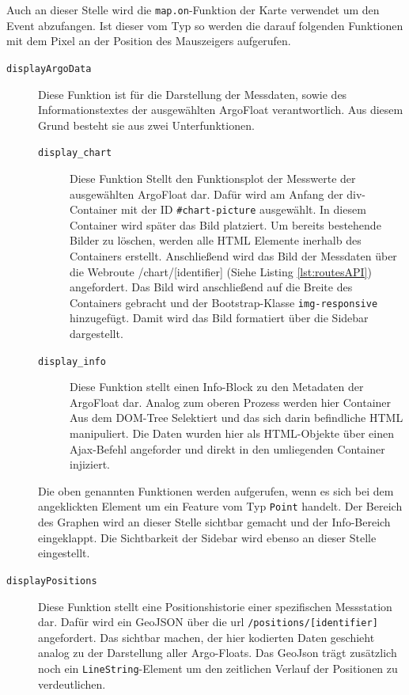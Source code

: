 Auch an dieser Stelle wird die \texttt{map.on}-Funktion der Karte verwendet um den Event abzufangen. Ist dieser vom Typ  so werden die darauf folgenden Funktionen mit dem Pixel an der Position des Mauszeigers aufgerufen.

\begin{description}
 \item [\texttt{displayArgoData}] 
    Diese Funktion ist für die Darstellung der Messdaten, sowie des Informationstextes der ausgewählten ArgoFloat verantwortlich. Aus diesem Grund besteht sie aus zwei Unterfunktionen.
    \begin{description}
    \item [\texttt{display\_chart}] 
        Diese Funktion Stellt den Funktionsplot der Messwerte der ausgewählten ArgoFloat dar. Dafür wird am Anfang der div-Container mit der ID \texttt{\#chart-picture} ausgewählt. In diesem Container wird später das Bild platziert. Um bereits bestehende Bilder zu löschen, werden alle HTML Elemente inerhalb des Containers erstellt. Anschließend wird das Bild der Messdaten über die Webroute /chart/[identifier] (Siehe Listing \ref{lst:routesAPI}) angefordert. Das Bild wird anschließend auf die Breite des Containers gebracht und der Bootstrap-Klasse \texttt{img-responsive} hinzugefügt. Damit wird das Bild formatiert über die Sidebar dargestellt. 
    \item [\texttt{display\_info}]  
        Diese Funktion stellt einen Info-Block zu den Metadaten der ArgoFloat dar. Analog zum oberen Prozess werden hier Container Aus dem DOM-Tree Selektiert und das sich darin befindliche  HTML manipuliert. Die Daten wurden hier als HTML-Objekte über einen Ajax-Befehl angeforder und direkt in den umliegenden Container injiziert.
    \end{description}
    
    Die oben genannten Funktionen werden aufgerufen, wenn es sich bei dem angeklickten Element um ein Feature vom Typ \texttt{Point} handelt. Der Bereich des Graphen wird an dieser Stelle sichtbar gemacht und der Info-Bereich eingeklappt. Die Sichtbarkeit der Sidebar wird ebenso an dieser Stelle eingestellt.
    
 \item [\texttt{displayPositions}] 
    Diese Funktion stellt eine Positionshistorie einer spezifischen Messstation dar. Dafür wird ein GeoJSON über die url \texttt{/positions/[identifier]} angefordert. Das sichtbar machen, der hier kodierten Daten geschieht analog zu der Darstellung aller Argo-Floats. Das GeoJson trägt zusätzlich noch ein \texttt{LineString}-Element um den zeitlichen Verlauf der Positionen zu verdeutlichen.
\end{description}





